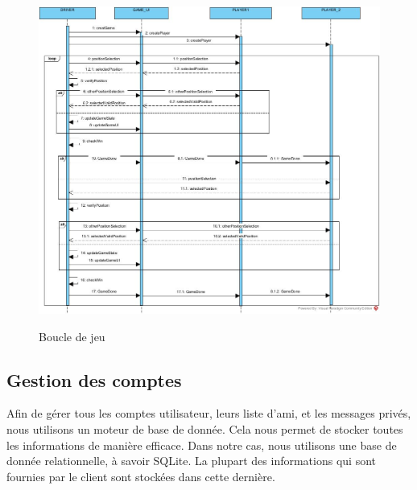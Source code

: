 \documentclass[../design_fonctionnement_sys.tex]{subfiles}
\begin{document}
\begin{figure}[H]
    \centering
    \includegraphics[scale=0.3]{img_design/Game.jpg}
    \label{fig:seq_gameloop_client}
    \caption{Boucle de jeu}
\end{figure}

\subsection{Gestion des comptes}
Afin de gérer tous les comptes utilisateur, leurs liste d'ami, et les messages privés, nous utilisons un moteur de base de donnée.
Cela nous permet de stocker toutes les informations de manière efficace. Dans notre cas, nous utilisons une base de donnée relationnelle, à savoir SQLite.
La plupart des informations qui sont fournies par le client sont stockées dans cette dernière.
\end{document}

